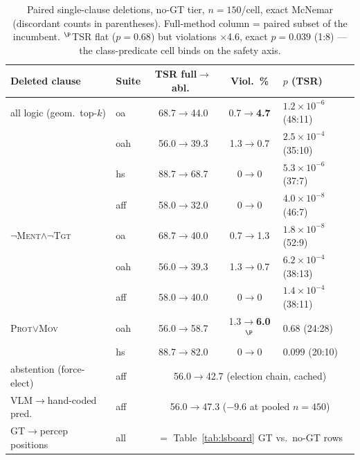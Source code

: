 \documentclass[conference]{IEEEtran}
\begin{document}
\begin{table}[t]
\centering
\caption{Paired single-clause deletions, no-GT tier, $n{=}150$/cell, exact McNemar (discordant counts in parentheses). Full-method column = paired subset of the incumbent. $^{\P}$TSR flat ($p=0.68$) but violations $\times$4.6, exact $p=0.039$ (1:8) --- the class-predicate cell binds on the safety axis.}
\label{tab:ablation}
\setlength{\tabcolsep}{3pt}
\small
\begin{tabular}{llccl}
\toprule
Deleted clause & Suite & TSR full$\to$abl.\ & Viol.\ \% & $p$ (TSR) \\
\midrule
all logic (geom.\ top-$k$) & oa & 68.7$\to$44.0 & 0.7$\to$\textbf{4.7} & $1.2\times10^{-6}$ (48:11) \\
 & oah & 56.0$\to$39.3 & 1.3$\to$0.7 & $2.5\times10^{-4}$ (35:10) \\
 & hs & 88.7$\to$68.7 & 0$\to$0 & $5.3\times10^{-6}$ (37:7) \\
 & aff & 58.0$\to$32.0 & 0$\to$0 & $4.0\times10^{-8}$ (46:7) \\
$\lnot$\textsc{Ment}$\wedge\lnot$\textsc{Tgt} & oa & 68.7$\to$40.0 & 0.7$\to$1.3 & $1.8\times10^{-8}$ (52:9) \\
 & oah & 56.0$\to$39.3 & 1.3$\to$0.7 & $6.2\times10^{-4}$ (38:13) \\
 & aff & 58.0$\to$40.0 & 0$\to$0 & $1.4\times10^{-4}$ (38:11) \\
\textsc{Prot}$\vee$\textsc{Mov} & oah & 56.0$\to$58.7 & 1.3$\to$\textbf{6.0}$^{\P}$ & $0.68$ (24:28) \\
 & hs & 88.7$\to$82.0 & 0$\to$0 & $0.099$ (20:10) \\
abstention (force-elect) & aff & \multicolumn{3}{c}{56.0$\to$42.7 (election chain, cached)} \\
VLM$\to$hand-coded pred. & aff & \multicolumn{3}{c}{56.0$\to$47.3 ($-9.6$ at pooled $n{=}450$)} \\
GT$\to$percep positions & all & \multicolumn{3}{c}{$=$ Table~\ref{tab:lsboard} GT vs.\ no-GT rows} \\
\bottomrule
\end{tabular}
\end{table}
\end{document}
